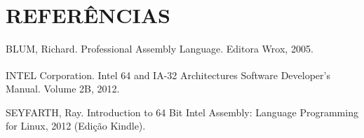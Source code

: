 \documentclass[a4paper]{article}
\def\TR{\textsuperscript{\textregistered}}
\begin{document}
\section*{REFERÊNCIAS}

\begin{thebibliography}{9}

 BLUM, Richard. Professional Assembly Language.  Editora Wrox, 2005.

 INTEL\TR{} Corporation. Intel\TR{} 64 and IA-32 Architectures Software
Developer’s Manual. Volume 2B, 2012.

 SEYFARTH, Ray. Introduction to 64 Bit Intel Assembly: Language
Programming for Linux, 2012 (Edição Kindle).

\end{thebibliography}
\end{document}
